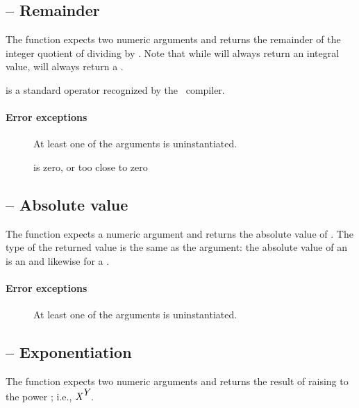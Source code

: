\subsection{ -- Remainder}
The  function expects two numeric arguments and returns the remainder of the integer quotient of dividing  by . Note that while  will always return an integral value,  will always return a .
    
 is a standard operator recognized by the \go\ compiler.
    
\paragraph{Error exceptions}
\begin{description}
\item[]
At least one of the arguments is uninstantiated.
\item[]
 is zero, or too close to zero
\end{description}

\subsection{ -- Absolute value}
The  function expects a numeric argument and returns the absolute value of . The type of the returned value is the same as the argument: the absolute value of an  is an  and likewise for a .
     
\paragraph{Error exceptions}
\begin{description}
\item[]
At least one of the arguments is uninstantiated.
\end{description}

\subsection{\function{**} -- Exponentiation}
The \function{**} function expects two numeric arguments and returns the result of raising  to the power ; i.e., ${\mbox{\rm\em X}}^{\mbox{\rm\em Y}}$.
    
